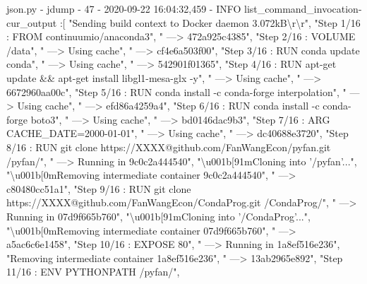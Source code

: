 \documentclass[
]{book}
\newenvironment{Shaded}{\begin{snugshade}}{\end{snugshade}}
\newcommand{\ExtensionTok}[1]{#1}
\newcommand{\NormalTok}[1]{#1}
\newcommand{\StringTok}[1]{\textcolor[rgb]{0.31,0.60,0.02}{#1}}
\begin{document}
\begin{Shaded}
\begin{Highlighting}[]
\ExtensionTok{json.py}\NormalTok{ - jdump - 47 -  2020-09-22 16:04:32,459 - INFO list_command_invocation-cur_output}
\NormalTok{:[}
    \StringTok{"Sending build context to Docker daemon  3.072kB\textbackslash{}r\textbackslash{}r"}\NormalTok{,}
    \StringTok{"Step 1/16 : FROM continuumio/anaconda3"}\NormalTok{,}
    \StringTok{" ---> 472a925c4385"}\NormalTok{,}
    \StringTok{"Step 2/16 : VOLUME /data"}\NormalTok{,}
    \StringTok{" ---> Using cache"}\NormalTok{,}
    \StringTok{" ---> cf4e6a503f00"}\NormalTok{,}
    \StringTok{"Step 3/16 : RUN conda update conda"}\NormalTok{,}
    \StringTok{" ---> Using cache"}\NormalTok{,}
    \StringTok{" ---> 542901f01365"}\NormalTok{,}
    \StringTok{"Step 4/16 : RUN apt-get update && apt-get install libgl1-mesa-glx -y"}\NormalTok{,}
    \StringTok{" ---> Using cache"}\NormalTok{,}
    \StringTok{" ---> 6672960aa00c"}\NormalTok{,}
    \StringTok{"Step 5/16 : RUN conda install -c conda-forge interpolation"}\NormalTok{,}
    \StringTok{" ---> Using cache"}\NormalTok{,}
    \StringTok{" ---> efd86a4259a4"}\NormalTok{,}
    \StringTok{"Step 6/16 : RUN conda install -c conda-forge boto3"}\NormalTok{,}
    \StringTok{" ---> Using cache"}\NormalTok{,}
    \StringTok{" ---> bd0146dac9b3"}\NormalTok{,}
    \StringTok{"Step 7/16 : ARG CACHE_DATE=2000-01-01"}\NormalTok{,}
    \StringTok{" ---> Using cache"}\NormalTok{,}
    \StringTok{" ---> dc40688e3720"}\NormalTok{,}
    \StringTok{"Step 8/16 : RUN git clone https://XXXX@github.com/FanWangEcon/pyfan.git /pyfan/"}\NormalTok{,}
    \StringTok{" ---> Running in 9c0c2a444540"}\NormalTok{,}
    \StringTok{"\textbackslash{}u001b[91mCloning into '/pyfan'..."}\NormalTok{,}
    \StringTok{"\textbackslash{}u001b[0mRemoving intermediate container 9c0c2a444540"}\NormalTok{,}
    \StringTok{" ---> c80480cc51a1"}\NormalTok{,}
    \StringTok{"Step 9/16 : RUN git clone https://XXXX@github.com/FanWangEcon/CondaProg.git /CondaProg/"}\NormalTok{,}
    \StringTok{" ---> Running in 07d9f665b760"}\NormalTok{,}
    \StringTok{"\textbackslash{}u001b[91mCloning into '/CondaProg'..."}\NormalTok{,}
    \StringTok{"\textbackslash{}u001b[0mRemoving intermediate container 07d9f665b760"}\NormalTok{,}
    \StringTok{" ---> a5ac6c6e1458"}\NormalTok{,}
    \StringTok{"Step 10/16 : EXPOSE 80"}\NormalTok{,}
    \StringTok{" ---> Running in 1a8ef516e236"}\NormalTok{,}
    \StringTok{"Removing intermediate container 1a8ef516e236"}\NormalTok{,}
    \StringTok{" ---> 13ab2965e892"}\NormalTok{,}
    \StringTok{"Step 11/16 : ENV PYTHONPATH /pyfan/"}\NormalTok{,}

\end{Highlighting}
\end{Shaded}
\end{document}
